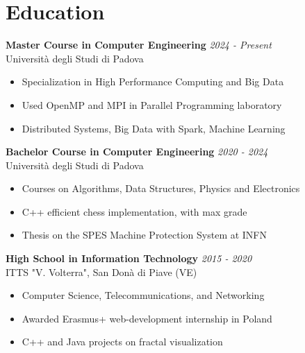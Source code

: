 \documentclass[a4paper,10pt]{article}
\begin{document}
\begin{minipage}[t]{0.58\textwidth}
    \section*{Education}
        \textbf{Master Course in Computer Engineering} \hfill \textit{2024 - Present} \\
        Università degli Studi di Padova %
        \vspace{0.1cm}
        \begin{itemize}[left=0.2cm, label={\textbullet}, itemsep=0cm]
            \item Specialization in High Performance Computing and Big Data
            \item Used OpenMP and MPI in Parallel Programming laboratory
            \item Distributed Systems, Big Data with Spark, Machine Learning
        \end{itemize}
        \vspace{0.2cm}

        \textbf{Bachelor Course in Computer Engineering}  \hfill \textit{2020 - 2024} \\
        Università degli Studi di Padova %
        \vspace{-0.1cm}
        \begin{itemize}[left=0.2cm, label={\textbullet}, itemsep=0cm]
            \item Courses on Algorithms, Data Structures, Physics and Electronics
            \item C++ efficient chess implementation, with max grade
            \item Thesis on the SPES Machine Protection System at INFN
        \end{itemize}
        \vspace{0.2cm}

        \textbf{High School in Information Technology} \hfill \textit{2015 - 2020} \\
        ITTS "V. Volterra", San Donà di Piave (VE) %
        \vspace{-0.1cm}
        \begin{itemize}[left=0.2cm, label={\textbullet}, itemsep=0cm]
            \item Computer Science, Telecommunications, and Networking
            \item Awarded Erasmus+ web-development internship in Poland
            \item C++ and Java projects on fractal visualization
        \end{itemize}


\end{minipage}
\end{document}
